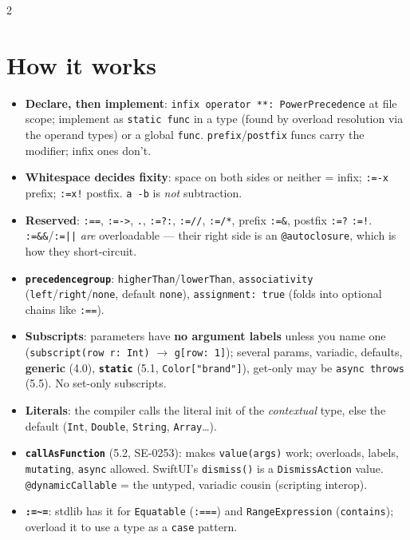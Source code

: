 \documentclass[8pt]{extarticle}
\makeatletter
\DeclareRobustCommand\op[1]{\texttt{\@tfor\@c:=#1\do{\hbox{\@c}}}}
\DeclareRobustCommand\tl{\textasciitilde}
\makeatother
\begin{document}
\begin{multicols}{2}
\raggedright

\section{How it works}
\begin{itemize}
  \item \textbf{Declare, then implement}: \texttt{infix operator **: PowerPrecedence} at file
        scope; implement as \texttt{static func} in a type (found by overload resolution via the
        operand types) or a global \texttt{func}. \texttt{prefix}/\texttt{postfix} funcs carry the
        modifier; infix ones don't.
  \item \textbf{Whitespace decides fixity}: space on both sides or neither = infix; \op{-x} prefix;
        \op{x!} postfix. \texttt{a -b} is \emph{not} subtraction.
  \item \textbf{Reserved}: \op{=}, \op{->}, \texttt{.}, \op{?:}, \op{//}, \op{/*}, prefix \op{\&},
        postfix \op{?} \op{!}. \op{\&\&}/\op{||} \emph{are} overloadable — their right side is an
        \texttt{@autoclosure}, which is how they short-circuit.
  \item \textbf{\texttt{precedencegroup}}: \texttt{higherThan}/\texttt{lowerThan},
        \texttt{associativity} (\texttt{left}/\texttt{right}/\texttt{none}, default
        \texttt{none}), \texttt{assignment: true} (folds into optional chains like \op{=}).
  \item \textbf{Subscripts}: parameters have \textbf{no argument labels} unless you name one
        (\texttt{subscript(row r: Int)} $\to$ \texttt{g[row: 1]}); several params, variadic,
        defaults, \textbf{generic} (4.0), \textbf{\texttt{static}} (5.1, \texttt{Color["brand"]}),
        get-only may be \texttt{async throws} (5.5). No set-only subscripts.
  \item \textbf{Literals}: the compiler calls the literal init of the \emph{contextual} type, else
        the default (\texttt{Int}, \texttt{Double}, \texttt{String}, \texttt{Array}\ldots).
  \item \textbf{\texttt{callAsFunction}} (5.2, SE-0253): makes \texttt{value(args)} work;
        overloads, labels, \texttt{mutating}, \texttt{async} allowed. SwiftUI's
        \texttt{dismiss()} is a \texttt{DismissAction} value. \texttt{@dynamicCallable} = the
        untyped, variadic cousin (scripting interop).
  \item \textbf{\op{\tl=}}: stdlib has it for \texttt{Equatable} (\op{==}) and
        \texttt{RangeExpression} (\texttt{contains}); overload it to use a type as a
        \texttt{case} pattern.
\end{itemize}


\end{multicols}
\end{document}
